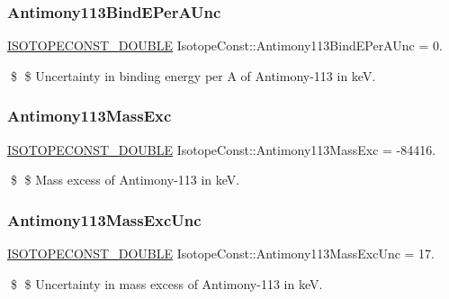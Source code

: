 \subsubsection{\texorpdfstring{Antimony113\+Bind\+E\+Per\+A\+Unc}{Antimony113BindEPerAUnc}}
{\footnotesize\ttfamily \mbox{\hyperlink{group___isotope_const-_macros_ga8f45a7272ce02c0b4c65c44636ed719a}{I\+S\+O\+T\+O\+P\+E\+C\+O\+N\+S\+T\+\_\+\+D\+O\+U\+B\+LE}} Isotope\+Const\+::\+Antimony113\+Bind\+E\+Per\+A\+Unc = 0.}

\$ \$ Uncertainty in binding energy per A of Antimony-\/113 in keV. \mbox{\label{group___isotope_const-_antimony-_sb113_ga2bfc2e0e3d679c8e622a3143742b51dc}} 
\subsubsection{\texorpdfstring{Antimony113\+Mass\+Exc}{Antimony113MassExc}}
{\footnotesize\ttfamily \mbox{\hyperlink{group___isotope_const-_macros_ga8f45a7272ce02c0b4c65c44636ed719a}{I\+S\+O\+T\+O\+P\+E\+C\+O\+N\+S\+T\+\_\+\+D\+O\+U\+B\+LE}} Isotope\+Const\+::\+Antimony113\+Mass\+Exc = -\/84416.}

\$ \$ Mass excess of Antimony-\/113 in keV. \mbox{\label{group___isotope_const-_antimony-_sb113_gac050547dc4d1d3f8ecd9f1b4094f837c}} 
\subsubsection{\texorpdfstring{Antimony113\+Mass\+Exc\+Unc}{Antimony113MassExcUnc}}
{\footnotesize\ttfamily \mbox{\hyperlink{group___isotope_const-_macros_ga8f45a7272ce02c0b4c65c44636ed719a}{I\+S\+O\+T\+O\+P\+E\+C\+O\+N\+S\+T\+\_\+\+D\+O\+U\+B\+LE}} Isotope\+Const\+::\+Antimony113\+Mass\+Exc\+Unc = 17.}

\$ \$ Uncertainty in mass excess of Antimony-\/113 in keV. \mbox{\label{group___isotope_const-_antimony-_sb113_gae473f1da5f3ae225e4c14faf203771b5}} 
